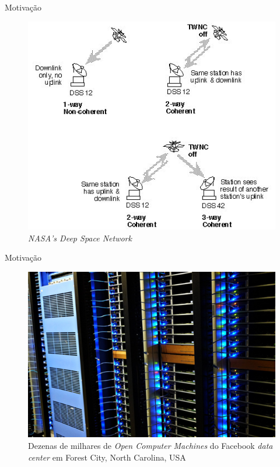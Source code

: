 
  \begin{frame}{Motivação}
   \begin{figure}[h]
     \centering
     \includegraphics[scale=.4]{bsfii6.jpg}
     \caption{\emph{NASA's Deep Space Network}\cite{JPLCIT:2012}}
     \label{fig2:nasa}
   \end{figure}
  \end{frame}

  \begin{frame}{Motivação}
   \begin{figure}[h]
     \centering
     \includegraphics[scale=.5]{facebook-data-center.jpg}
     \caption{Dezenas de milhares de \emph{Open Computer Machines} do Facebook \emph{data center} em Forest City, North Carolina, USA
\cite{VBFB:2012}}
     \label{fig5:fdc}
   \end{figure}
  \end{frame}

